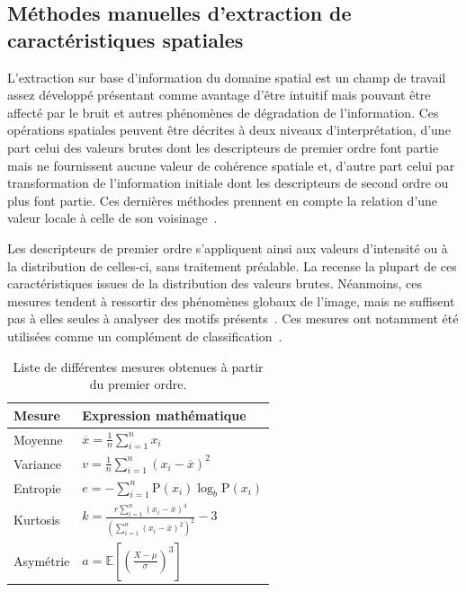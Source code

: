 \subsection{Méthodes manuelles d'extraction de caractéristiques spatiales}
L'extraction sur base d'information du domaine spatial est un champ de travail assez développé présentant comme avantage d'être intuitif mais pouvant être affecté par le bruit et autres phénomènes de dégradation de l'information. Ces opérations spatiales peuvent être décrites à deux niveaux d'interprétation, d'une part celui des valeurs brutes dont les descripteurs de premier ordre font partie mais ne fournissent aucune valeur de cohérence spatiale et, d'autre part celui par transformation de l'information initiale dont les descripteurs de second ordre ou plus font partie. Ces dernières méthodes prennent en compte la relation d'une valeur locale à celle de son voisinage~\cite{Kamila2015}.\par

Les descripteurs de premier ordre s'appliquent ainsi aux valeurs d'intensité ou à la distribution de celles-ci, sans traitement préalable. La  recense la plupart de ces caractéristiques issues de la distribution des valeurs brutes. Néanmoins, ces mesures tendent à ressortir des phénomènes globaux de l'image, mais ne suffisent pas à elles seules à analyser des motifs présents~\cite{Tomita1990, Srinivasan2008, Uyun2013, NyeinNyeinHlaing2015}. Ces mesures ont notamment été utilisées comme un complément de classification~\cite{Wiltgen2008}.\par

\begin{table}[H]
    \centering
    \begin{tabular}{ll}
        \toprule
        \textbf{Mesure}             & \textbf{Expression mathématique}                                                  \\ \hline
        Moyenne                     & $\overline{x} = \frac{1}{n}\sum_{i=1}^n x_i$                                      \\   
        Variance                    & $v = \frac{1}{n}\sum_{i=1}^n \left(x_i - \overline{x}\right)^2$                   \\ 
        Entropie                    & $e = -\sum_{i=1}^n {\mathrm{P}(x_i) \log_b \mathrm{P}(x_i)}$                      \\
        Kurtosis                    & $k=\frac{r \sum_{i=1}^{n}\left(x_{i}-\bar{x}\right)^{4}}{\left(\sum_{i=1}^{n}\left(x_{i}-\bar{x}\right)^{2}\right)^{2}}-3$\\
        Asymétrie                   & $a = \mathbb{E} \left[ \left( \frac{X - \mu}{\sigma} \right)^3 \right]$           \\  
        \bottomrule
    \end{tabular}
    \caption{Liste de différentes mesures obtenues à partir du premier ordre.}
    \label{tab:first_order_descriptors}
\end{table}\par

